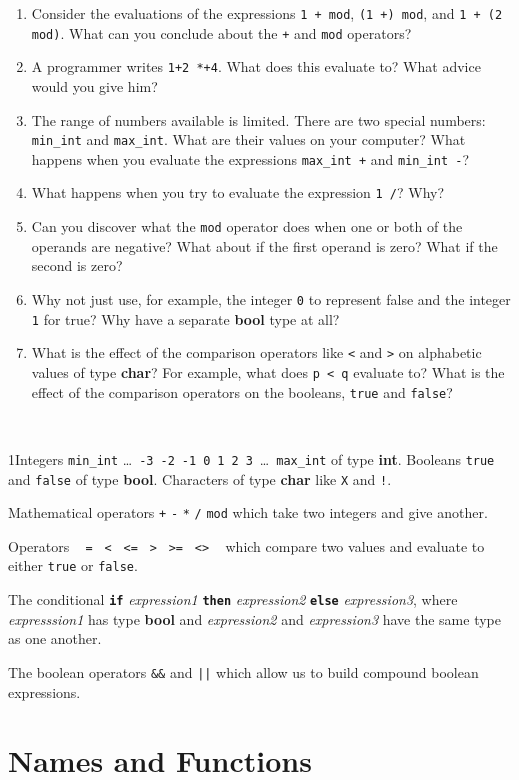\documentclass[]{book}
\newcommand\upquote[1]{\textquotesingle#1\textquotesingle}
\newcommand{\sofarstartingoff}{

\noindent \lettrine[loversize=0.1,nindent=0em]{1}{}Integers \texttt{min\_int} \ldots\ \texttt{-3}\ \texttt{-2}\ \texttt{-1}\ \texttt{0}\ \texttt{1}\ \texttt{2}\ \texttt{3}\ \ldots\ \texttt{max\_int} of type \textbf{\textsf{int}}. Booleans \texttt{true} and \texttt{false} of type \textbf{\textsf{bool}}. \noindent Characters of type \textsf{\textbf{char}} like \texttt{\upquote{X}} and \texttt{\upquote{!}}.
\vspace{2mm}

\noindent Mathematical operators \texttt{+} \texttt{-} \texttt{*} \texttt{/} \texttt{mod} which take two integers and give another.

\vspace{2mm}

\noindent Operators \ \!\! \texttt{=\ \!\!} \texttt{<\ \!\!} \texttt{<=\ \!\!} \texttt{>\ \!\!} \texttt{>=\ \!\!} \texttt{<>} \ \!\! which compare two values and evaluate to either \texttt{true} or \texttt{false}.

\vspace{2mm}

\noindent The conditional \textbf{\texttt{if}} \textit{expression1} \textbf{\texttt{then}} \textit{expression2} \textbf{\texttt{else}} \textit{expression3}, where \textit{expresssion1} has type \textsf{\textbf{bool}} and \textit{expression2} and \textit{expression3} have the same type as one another.

\vspace{2mm}

\noindent The boolean operators \texttt{\&\&} and \texttt{||} which allow us to build compound boolean expressions.}
\begin{document}
\begin{enumerate}
\item Consider the evaluations of the expressions \texttt{1\! +\! mod}, \texttt{(1\! +)\! mod}, and \texttt{1\! +\! (2\! mod)}. What can you conclude about the \texttt{+} and \texttt{mod} operators?
\item A programmer writes \texttt{1+2\! *+4}. What does this evaluate to? What advice would you give him?
\item {\begin{sloppypar}The range of numbers available is limited. There are two special numbers: \texttt{min\_int} and \texttt{max\_int}. What are their values on your computer? What happens when you evaluate the expressions \texttt{max\_int\! +} and \texttt{min\_int\! -}?\end{sloppypar}}
\item What happens when you try to evaluate the expression \texttt{1\! /}? Why?
\item Can you discover what the \texttt{mod} operator does when one or both of the operands are negative? What about if the first operand is zero? What if the second is zero?
\item Why not just use, for example, the integer \texttt{0} to represent false and the integer \texttt{1} for true? Why have a separate \textbf{\textsf{bool}} type at all?
\item What is the effect of the comparison operators like \texttt{<} and \texttt{>} on alphabetic values of type \textbf{\textsf{char}}? For example, what does \texttt{\upquote{p}\! <\! \upquote{q}} evaluate to? What is the effect of the comparison operators on the booleans, \texttt{true} and \texttt{false}?
\end{enumerate}

\cleardoublepage
\thispagestyle{empty}
\\

\begin{multicols*}{2}
\footnotesize
\sofarstartingoff

\end{multicols*}

\thispagestyle{empty}

\chapter{Names and Functions}
\label{functions}
\end{document}
